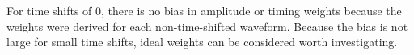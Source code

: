 For time shifts of 0, there is no bias in amplitude or timing weights because the weights were derived for each non-time-shifted waveform. Because the bias is not large for small time shifts, ideal weights can be considered worth investigating. 



